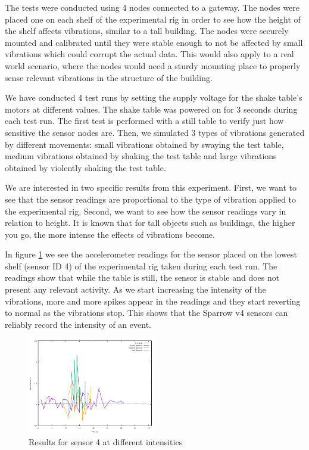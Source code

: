 The tests were conducted using 4 nodes connected to a gateway. The nodes were placed one on each shelf of the experimental rig in order to see how the height of the shelf affects vibrations, 
similar to a tall building. The nodes were securely mounted and calibrated until they were stable enough to not be affected by small vibrations which could corrupt the actual data. 
This would also apply to a real world scenario, where the nodes would need a sturdy mounting place to properly sense relevant vibrations in the structure of the building.

We have conducted 4 test runs by setting the supply voltage for the shake table's motors at different values. The shake table was powered on for 3 seconds during each test run. The first test is performed with a still table to verify just how sensitive the sensor nodes are. Then, we simulated 3 types of vibrations generated by different movements: small vibrations obtained by swaying the test table, medium vibrations obtained by shaking the test table and large vibrations obtained by 
violently shaking the test table.

We are interested in two specific results from this experiment. First, we want to see that the sensor readings are proportional to the type of vibration applied to 
the experimental rig. Second, we want to see how the sensor readings vary in relation to height. It is known that for tall objects such as buildings, the higher you 
go, the more intense the effects of vibrations become.

In figure \ref{fig:sensor-4} we see the accelerometer readings for the sensor placed on the lowest shelf (sensor ID 4) of the experimental rig taken during each test run. The
readings show that while the table is still, the sensor is stable and does not present any relevant activity. As we start increasing the intensity of the vibrations,
more and more spikes appear in the readings and they start reverting to normal as the vibrations stop. This shows that the Sparrow v4 sensors can reliably record 
the intensity of an event.

\begin{figure}[ht] \centering
  \includegraphics[width=0.5\textwidth]{img/sensor-4-data}
  \caption{Results for sensor 4 at different intensities}
  \label{fig:sensor-4}
\end{figure}

